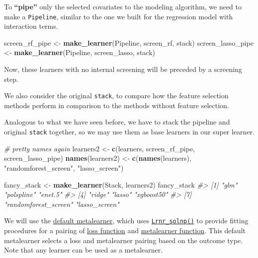 \documentclass[12pt, krantz2,]{book}
\newenvironment{Shaded}{\begin{snugshade}}{\end{snugshade}}
\newcommand{\CommentTok}[1]{\textcolor[rgb]{0.56,0.35,0.01}{\textit{#1}}}
\newcommand{\KeywordTok}[1]{\textcolor[rgb]{0.13,0.29,0.53}{\textbf{#1}}}
\newcommand{\NormalTok}[1]{#1}
\newcommand{\StringTok}[1]{\textcolor[rgb]{0.31,0.60,0.02}{#1}}
\theoremstyle{definition}
\theoremstyle{definition}
\theoremstyle{definition}
\newcommand{\1}{\mathbbm{1}}
\begin{document}
To \textbf{``pipe''} only the selected covariates to the modeling algorithm, we need to
make a \texttt{Pipeline}, similar to the one we built for the regression model with
interaction terms.

\begin{Shaded}
\begin{Highlighting}[]
\NormalTok{screen_rf_pipe <-}\StringTok{ }\KeywordTok{make_learner}\NormalTok{(Pipeline, screen_rf, stack)}
\NormalTok{screen_lasso_pipe <-}\StringTok{ }\KeywordTok{make_learner}\NormalTok{(Pipeline, screen_lasso, stack)}
\end{Highlighting}
\end{Shaded}

Now, these learners with no internal screening will be preceded by a screening
step.

We also consider the original \texttt{stack}, to compare how the feature selection
methods perform in comparison to the methods without feature selection.

Analogous to what we have seen before, we have to stack the pipeline and
original \texttt{stack} together, so we may use them as base learners in our super
learner.

\begin{Shaded}
\begin{Highlighting}[]
\CommentTok{# pretty names again}
\NormalTok{learners2 <-}\StringTok{ }\KeywordTok{c}\NormalTok{(learners, screen_rf_pipe, screen_lasso_pipe)}
\KeywordTok{names}\NormalTok{(learners2) <-}\StringTok{ }\KeywordTok{c}\NormalTok{(}\KeywordTok{names}\NormalTok{(learners), }\StringTok{"randomforest_screen"}\NormalTok{, }\StringTok{"lasso_screen"}\NormalTok{)}

\NormalTok{fancy_stack <-}\StringTok{ }\KeywordTok{make_learner}\NormalTok{(Stack, learners2)}
\NormalTok{fancy_stack}
\CommentTok{#> [1] "glm"                 "polspline"           "enet.5"             }
\CommentTok{#> [4] "ridge"               "lasso"               "xgboost50"          }
\CommentTok{#> [7] "randomforest_screen" "lasso_screen"}
\end{Highlighting}
\end{Shaded}

We will use the \href{https://tlverse.org/sl3/reference/default_metalearner.html}{default
metalearner}, which
uses \href{https://tlverse.org/sl3/reference/Lrnr_solnp.html}{\texttt{Lrnr\_solnp()}} to
provide fitting procedures for a pairing of \href{https://tlverse.org/sl3/reference/loss_functions.html}{loss
function} and
\href{https://tlverse.org/sl3/reference/metalearners.html}{metalearner function}.
This default metalearner selects a loss and metalearner pairing based on the
outcome type. Note that any learner can be used as a metalearner.
\end{document}
